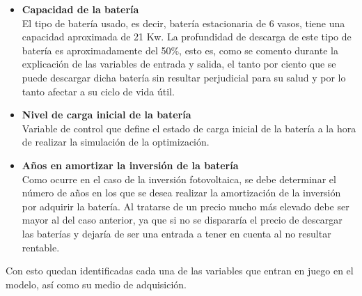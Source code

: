 \begin{itemize}
	\item \textbf{Capacidad de la batería}\\ El tipo de batería usado, es decir, batería estacionaria de 6 vasos, tiene una capacidad aproximada de 21 Kw. La profundidad de descarga de este tipo de batería es aproximadamente del 50\%, esto es, como se comento durante la explicación de las variables de entrada y salida, el tanto por ciento que se puede descargar dicha batería sin resultar perjudicial para su salud y por lo tanto afectar a su ciclo de vida útil.
	\item \textbf{Nivel de carga inicial de la batería}\\ Variable de control que define el estado de carga inicial de la batería a la hora de realizar la simulación de la optimización.
	\item \textbf{Años en amortizar la inversión de la batería}\\ Como ocurre en el caso de la inversión fotovoltaica, se debe determinar el número de años en los que se desea realizar la amortización de la inversión por adquirir la batería. Al tratarse de un precio mucho más elevado debe ser mayor al del caso anterior, ya que si no se dispararía el precio de descargar las baterías y dejaría de ser una entrada a tener en cuenta al no resultar rentable.
\end{itemize}
Con esto quedan identificadas cada una de las variables que entran en juego en el modelo, así como su medio de adquisición.
